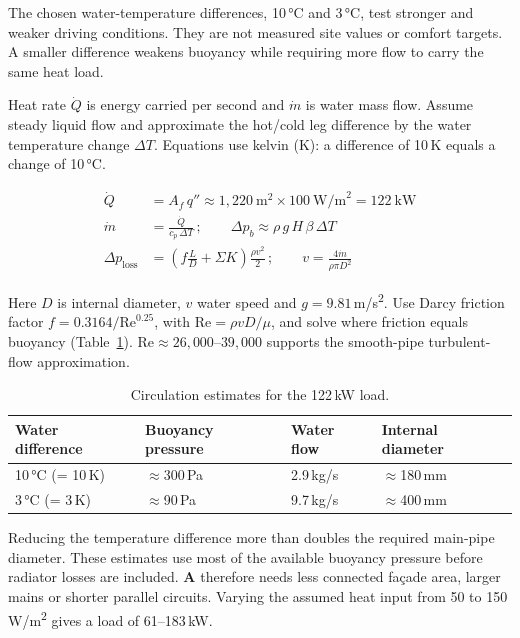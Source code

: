 The chosen water-temperature differences, 10\,°C and 3\,°C, test stronger and weaker
driving conditions. They are not measured site values or comfort targets. A smaller
difference weakens buoyancy while requiring more flow to carry the same heat load.

Heat rate $\dot Q$ is energy carried per second and $\dot m$ is water mass flow. Assume
steady liquid flow and approximate the hot/cold leg difference by the water temperature
change $\Delta T$. Equations use kelvin (K): a difference of 10\,K equals a change of
10\,°C.

\begin{align}
\dot Q &= A_f\, q'' \approx 1{,}220\ \text{m}^2 \times 100\ \text{W/m}^2 = 122\ \text{kW} \\
\dot m &= \frac{\dot Q}{c_p\, \Delta T}\,; \qquad
\Delta p_b \approx \rho\, g\, H\, \beta\, \Delta T \\
\Delta p_{\text{loss}} &= \left(f \frac{L}{D} + \Sigma K\right) \frac{\rho v^2}{2}\,; \qquad
v = \frac{4 \dot m}{\rho \pi D^2}
\end{align}

Here $D$ is internal diameter, $v$ water speed and $g = 9.81$\,m/s\textsuperscript{2}.
Use Darcy friction factor $f = 0.3164/\mathrm{Re}^{0.25}$, with
$\mathrm{Re} = \rho v D/\mu$, and solve where friction equals buoyancy \cite{akhter2021}
(Table~\ref{tab:circulation}). $\mathrm{Re} \approx 26{,}000$--$39{,}000$ supports the
smooth-pipe turbulent-flow approximation.

\begin{table}[H]
\centering\small
\caption{Circulation estimates for the 122\,kW load.}
\label{tab:circulation}
\renewcommand{\arraystretch}{1.2}
\begin{tabular}{l l l l}
\toprule
\textbf{Water difference} & \textbf{Buoyancy pressure} & \textbf{Water flow} & \textbf{Internal diameter} \\
\midrule
10\,°C (= 10\,K) & $\approx$300\,Pa & 2.9\,kg/s & $\approx$180\,mm \\
3\,°C (= 3\,K) & $\approx$90\,Pa & 9.7\,kg/s & $\approx$400\,mm \\
\bottomrule
\end{tabular}
\end{table}

Reducing the temperature difference more than doubles the required main-pipe diameter.
These estimates use most of the available buoyancy pressure before radiator losses are
included. \textbf{A} therefore needs less connected façade area, larger mains or shorter
parallel circuits. Varying the assumed heat input from 50 to 150\,W/m\textsuperscript{2}
gives a load of 61--183\,kW.

